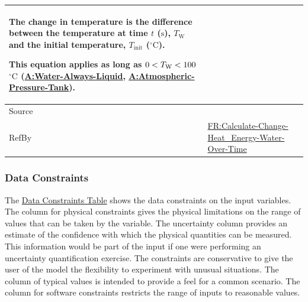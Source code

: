 \documentclass[12pt]{article}
\newcommand{\lt}{\ensuremath <}
\begin{document}
\begin{minipage}{\textwidth}
\begin{tabular}{>{\raggedright}p{}>{\raggedright\arraybackslash}p{}}
        The change in temperature is the difference between the temperature at time $t$ (${\text{s}}$), ${T_{\text{W}}}$ and the initial temperature, ${T_{\text{init}}}$ (${{}^{\circ}\text{C}}$).
        
        This equation applies as long as $0\lt{}{T_{\text{W}}}\lt{}100$${{}^{\circ}\text{C}}$ (\hyperref[assumpWAL]{A:Water-Always-Liquid}, \hyperref[assumpAPT]{A:Atmospheric-Pressure-Tank}).
        
\\ \midrule
Source & \cite{koothoor2013}
         
\\ \midrule
RefBy & \hyperref[calcChgHeatEnergyWtrOverTime]{FR:Calculate-Change-Heat\_Energy-Water-Over-Time}
        
\\ \bottomrule
\end{tabular}
\end{minipage}

\subsubsection{Data Constraints}
\label{Sec:DataConstraints}
The \hyperref[Table:InDataConstraints]{Data Constraints Table} shows the data constraints on the input variables. The column for physical constraints gives the physical limitations on the range of values that can be taken by the variable. The uncertainty column provides an estimate of the confidence with which the physical quantities can be measured. This information would be part of the input if one were performing an uncertainty quantification exercise. The constraints are conservative to give the user of the model the flexibility to experiment with unusual situations. The column of typical values is intended to provide a feel for a common scenario. The column for software constraints restricts the range of inputs to reasonable values.
\end{document}
